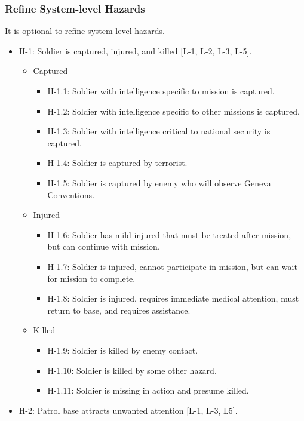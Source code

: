 \documentclass[../../main/main.tex]{subfiles}
\begin{document}
\subsubsection{Refine System-level Hazards}
It is optional to refine system-level hazards.  

\begin{itemize}
\item H-1: Soldier is captured, injured, and killed [L-1, L-2, L-3, L-5].\\
\begin{itemize}
\item Captured

\begin{itemize}
\item H-1.1: Soldier with intelligence specific to mission is captured.
\item H-1.2: Soldier with intelligence specific to other missions is captured.
\item H-1.3: Soldier with intelligence critical to national security is captured.
\item H-1.4: Soldier is captured by terrorist.
\item H-1.5: Soldier is captured by enemy who will observe Geneva Conventions.
\end{itemize}

\item Injured
\begin{itemize}
\item H-1.6: Soldier has mild injured that must be treated after mission, but can continue with mission.
\item H-1.7: Soldier is injured, cannot participate in mission, but can wait for mission to complete.
\item H-1.8: Soldier is injured, requires immediate medical attention, must return to base, and requires assistance.
\end{itemize}

\item Killed
\begin{itemize}
\item H-1.9: Soldier is killed by enemy contact.
\item H-1.10: Soldier is killed by some other hazard.
\item H-1.11: Soldier is missing in action and presume killed.
\end{itemize}
\end{itemize}

\item H-2: Patrol base attracts unwanted attention [L-1, L-3, L5].\\


\end{itemize}
\end{document}
